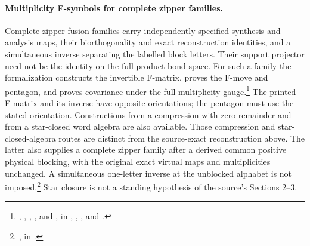 \documentclass{article}
\begin{document}
\paragraph{Multiplicity F-symbols for complete zipper families.}
Complete zipper fusion families carry independently specified synthesis
and analysis maps, their biorthogonality and exact reconstruction
identities, and a simultaneous inverse separating the labelled block
letters. Their support projector need not be the identity on the full
product bond space. For such a family the formalization constructs the
invertible F-matrix, proves the F-move and pentagon, and proves covariance
under the full multiplicity gauge.\footnote{
    ,
    ,
    ,
    , and
    , in
    ,
    ,
    , and
    .}
The printed F-matrix and its inverse have opposite orientations; the
pentagon must use the stated orientation. Constructions from a compression
with zero remainder and from a star-closed word algebra are also available.
Those compression and star-closed-algebra routes are distinct from the
source-exact reconstruction above. The latter also supplies a complete
zipper family after a derived common positive physical blocking, with the
original exact virtual maps and multiplicities unchanged. A simultaneous
one-letter inverse at the unblocked alphabet is not imposed.\footnote{
    , in
    .}
Star closure is not a standing hypothesis of the source's Sections 2--3.
\end{document}
